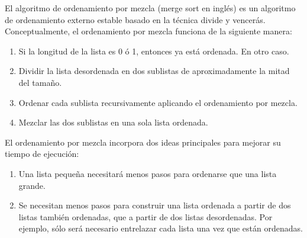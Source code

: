 El algoritmo de ordenamiento por mezcla (merge sort en inglés) es un algoritmo de ordenamiento externo estable basado en la técnica divide y vencerás. Conceptualmente, el ordenamiento por mezcla funciona de la siguiente manera:
\begin{enumerate}
	\item Si la longitud de la lista es 0 ó 1, entonces ya está ordenada. En otro caso.
	\item Dividir la lista desordenada en dos sublistas de aproximadamente la mitad del tamaño.
	\item Ordenar cada sublista recursivamente aplicando el ordenamiento por mezcla. 
	\item Mezclar las dos sublistas en una sola lista ordenada.
\end{enumerate}
El ordenamiento por mezcla incorpora dos ideas principales para mejorar su tiempo de ejecución:
\begin{enumerate}
	\item Una lista pequeña necesitará menos pasos para ordenarse que una lista grande.
	\item Se necesitan menos pasos para construir una lista ordenada a partir de dos listas también ordenadas, que a partir de dos listas desordenadas. Por ejemplo, sólo será necesario entrelazar cada lista una vez que están ordenadas. 
\end{enumerate}
